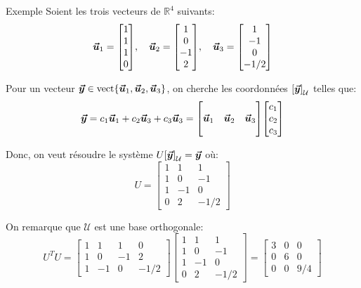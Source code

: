 \documentclass[a4paper]{article}
\begin{document}
\begin{parag}{Exemple}
    Soient les trois vecteurs de $\mathbb{R}^4$ suivants:
    \[\bvec{u}_1 = \begin{bmatrix} 1 \\ 1 \\ 1 \\ 0 \end{bmatrix}, \mathspace \bvec{u}_2 = \begin{bmatrix} 1 \\ 0 \\ -1 \\ 2 \end{bmatrix}, \mathspace \bvec{u}_3 = \begin{bmatrix} 1 \\ -1 \\ 0 \\ -1 / 2 \end{bmatrix} \]

    Pour un vecteur $\bvec{y} \in \vect\left\{\bvec{u}_1, \bvec{u}_2, \bvec{u}_3\right\}$, on cherche les coordonnées $\left[\bvec{y}\right]_{\mathcal{U}}$ telles que:
    \[\bvec{y} = c_1 \bvec{u}_1 + c_2 \bvec{u}_3 + c_3 \bvec{u}_3 = \begin{bmatrix}  &  &  \\ \bvec{u}_1 & \bvec{u}_2 & \bvec{u}_3 \\  &  &  \end{bmatrix} \begin{bmatrix} c_1 \\ c_2 \\ c_3 \end{bmatrix} \]

    Donc, on veut résoudre le système $U \left[\bvec{y}\right]_{\mathcal{U}} = \bvec{y}$ où:
    \[U = \begin{bmatrix} 1 & 1 & 1 \\ 1 & 0 & -1 \\ 1 & -1 & 0 \\ 0 & 2 & -1 / 2 \end{bmatrix} \]

    On remarque que $\mathcal{U}$ est une base orthogonale:
    \[U^T U = \begin{bmatrix} 1 & 1 & 1 & 0 \\ 1 & 0 & -1 & 2 \\ 1 & -1 & 0 & -1 / 2 \end{bmatrix} \begin{bmatrix} 1 & 1 & 1 \\ 1 & 0 & -1 \\ 1 & -1 & 0 \\ 0 & 2 & -1 / 2 \end{bmatrix} = \begin{bmatrix} 3 & 0 & 0 \\ 0 & 6 & 0 \\ 0 & 0 & 9 / 4 \end{bmatrix} \]


\end{parag}
\end{document}
